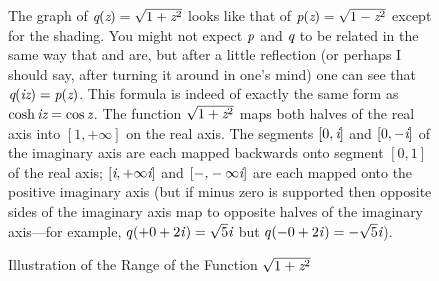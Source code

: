 \clearpage

\begin{figure}
\caption{Illustration of the Range of the Function $\protect\sqrt{1+\emph{z}^2}$}
\label{LAST-PLOT}
\small\noindent
The graph of $\emph{q}(\emph{z})=\sqrt{1+\emph{z}^2}$ looks like that
of $\emph{p}(\emph{z})=\sqrt{1-\emph{z}^2}$ except for
the shading.  You might not expect $\emph{p}$ and $\emph{q}$ to be related in the same
way that  and  are, but after a little reflection (or perhaps
I should say, after turning it around in one's mind) one can see that
$\emph{q}(\emph{i}\emph{z})=\emph{p}(\emph{z})$.  This formula is indeed of exactly the same form as
$\cosh \emph{i}\emph{z} = \cos \emph{z}$.  The function
$\sqrt{1+\emph{z}^2}$ maps both halves of the real axis into $[1,+\infty]$ on the real axis.
The segments $[0,\emph{i}]$ and $[0,-\emph{i}]$ of the imaginary axis are each mapped
backwards onto segment $[0,1]$ of the real axis; $[\emph{i},+\infty \emph{i}]$ and
$[-\emph{,}-\infty \emph{i}]$ are each mapped onto the positive imaginary axis
(but if minus zero is supported then opposite sides of the
imaginary axis map to opposite halves of the imaginary axis---for example,
$q(+0+2\emph{i\/})=\sqrt{5}\emph{i}$ but $q(-0+2\emph{i\/})=-\sqrt{5}\emph{i}$).
\end{figure}


